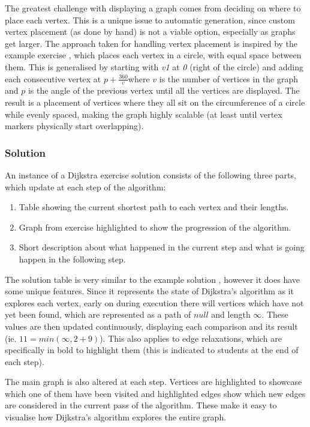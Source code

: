 \documentclass{l4proj}
\begin{document}
The greatest challenge with displaying a graph comes from deciding on where to place each vertex. This is a unique issue to automatic generation, since custom vertex placement (as done by hand) is not a viable option, especially as graphs get larger. The approach taken for handling vertex placement is inspired by the example exercise \cite{a}, which places each vertex in a circle, with equal space between them. This is generalised by starting with \emph{v1} at \emph{0 \textdegree} (right of the circle) and adding each consecutive vertex at $p+\frac{360 }{v}$\textdegree where $v$ is the number of vertices in the graph and $p$ is the angle of the previous vertex until all the vertices are displayed. The result is a placement of vertices where they all sit on the circumference of a circle while evenly spaced, making the graph highly scalable (at least until vertex markers physically start overlapping).

\subsubsection{Solution}

An instance of a Dijkstra exercise solution consists of the following three parts, which update at each step of the algorithm:

\begin{enumerate}
	\item
	Table showing the current shortest path to each vertex and their lengths.
	\item
	Graph from exercise highlighted to show the progression of the algorithm.
	\item
	Short description about what happened in the current step and what is going happen in the following step.
\end{enumerate}

The solution table is very similar to the example solution \cite{a}, however it does have some unique features. Since it represents the state of Dijkstra's algorithm as it explores each vertex, early on during execution there will vertices which have not yet been found, which are represented as a path of $null$ and length $\infty$. These values are then updated continuously, displaying each comparison and its result (ie. $11 = min(\infty, 2+9)$). This also applies to edge relaxations, which are specifically in bold to highlight them (this is indicated to students at the end of each step).

The main graph is also altered at each step. Vertices are highlighted to showcase which one of them have been visited and highlighted edges show which new edges are considered in the current pass of the algorithm. These make it easy to visualise how Dijkstra's algorithm explores the entire graph.
\end{document}
